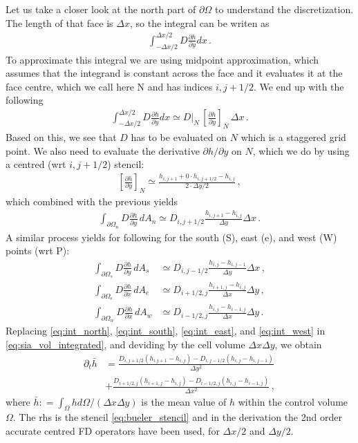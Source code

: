 \documentclass[11pt,a4paper]{article}
\newcommand{\p}{\partial}
\begin{document}
Let us take a closer look at the north part of $\p \Omega$ to understand the discretization. The length of that face is $\Delta x$, so the integral can be writen as
\begin{align*}
    \int_{-\Delta x/2}^{\Delta x/2} D \frac{\p h}{\p y} dx
    \,.
\end{align*}
To approximate this integral we are using midpoint approximation, which assumes that the integrand is constant across the face and it evaluates it at the face centre, which we call here N and has indices $i,j+1/2$. We end up with the following
\begin{align*}
    \int_{-\Delta x/2}^{\Delta x/2} D \frac{\p h}{\p y} dx
    \simeq
    D|_N \, \left[\frac{\p h}{\p y}\right]_{N} \, \Delta x
    \,.
\end{align*}
Based on this, we see that $D$ has to be evaluated on $N$ which is a staggered grid point. We also need to evaluate the derivative $\p h/\p y$ on $N$, which we do by using a centred (wrt $i,j+1/2$) stencil:
\begin{align*}
    \left[\frac{\p h}{\p y}\right]_{N} \simeq \frac{h_{i,j+1} + 0 \cdot h_{i,j+1/2} - h_{i,j}}{2 \cdot \Delta y/2}
    \,,
\end{align*}
which combined with the previous yields
\begin{align}
    \int_{\p \Omega_n} D \frac{\p h}{\p y} \, dA_n 
    \simeq D_{i,j+1/2} \frac{h_{i,j+1}-h_{i,j}}{\Delta y} \Delta x
    \,.
    \label{eq:int_north}
\end{align}
A similar process yields for following for the south (S), east (e), and west (W) points (wrt P):
\begin{align}
    \int_{\p \Omega_s} D \frac{\p h}{\p y} \, dA_s 
    & 
    \simeq D_{i,j-1/2} \frac{h_{i,j}-h_{i,j-1}}{\Delta y} \Delta x
    \,,
    \label{eq:int_south}
    \\
    \int_{\p \Omega_e} D \frac{\p h}{\p x} \, dA_e 
    & 
    \simeq D_{i+1/2,j} \frac{h_{i+1,j}-h_{i,j}}{\Delta x} \Delta y
    \,,
    \label{eq:int_east}
    \\
    \int_{\p \Omega_w} D \frac{\p h}{\p x} \, dA_w 
    & 
    \simeq D_{i-1/2,j} \frac{h_{i,j}-h_{i-1,j}}{\Delta x} \Delta y
    \,.
    \label{eq:int_west}
\end{align}
Replacing \eqref{eq:int_north}, \eqref{eq:int_south}, \eqref{eq:int_east}, and \eqref{eq:int_west} in \eqref{eq:sia_vol_integrated}, and deviding by the cell volume $\Delta x \Delta y$, we obtain
\begin{align}
    \p_t \bar{h}
    &=
    \frac{D_{i,j+1/2}(h_{i.j+1}-h_{i,j}) - D_{i,j-1/2}(h_{i,j}-h_{i,j-1})}{\Delta y^2}
    \nonumber
    \\
    &+
    \frac{D_{i+1/2,j}(h_{i+1,j}-h_{i,j}) - D_{i-1/2,j}(h_{i,j}-h_{i-1,j})}{\Delta x^2}
    \,,
\end{align}
where $\bar{h} : = \int_{\Omega} h d \Omega / (\Delta x \Delta y)$ is the mean value of $h$ within the control volume $\Omega$. The rhs is the stencil \eqref{eq:bueler_stencil} and in the derivation the 2nd order accurate centred FD operators have been used, for $\Delta x/2$ and $\Delta y/2$.
\end{document}
